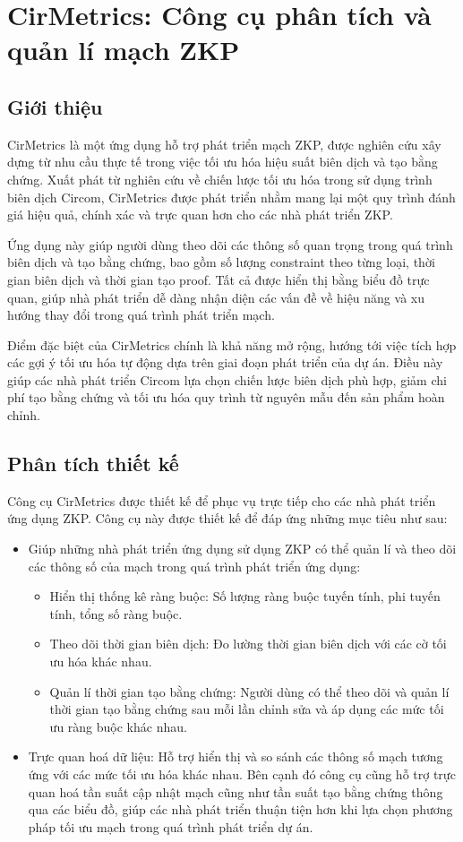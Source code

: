 \chapter{CirMetrics: Công cụ phân tích và quản lí mạch ZKP}
\label{chap:chap6}
\section{Giới thiệu}
CirMetrics là một ứng dụng hỗ trợ phát triển mạch ZKP, được nghiên cứu xây dựng từ nhu cầu thực tế trong việc tối ưu hóa hiệu suất biên dịch và tạo bằng chứng. Xuất phát từ nghiên cứu về chiến lược tối ưu hóa trong sử dụng trình biên dịch Circom, CirMetrics được phát triển nhằm mang lại một quy trình đánh giá hiệu quả, chính xác và trực quan hơn cho các nhà phát triển ZKP.

Ứng dụng này giúp người dùng theo dõi các thông số quan trọng trong quá trình biên dịch và tạo bằng chứng, bao gồm số lượng constraint theo từng loại, thời gian biên dịch và thời gian tạo proof. Tất cả được hiển thị bằng biểu đồ trực quan, giúp nhà phát triển dễ dàng nhận diện các vấn đề về hiệu năng và xu hướng thay đổi trong quá trình phát triển mạch.

Điểm đặc biệt của CirMetrics chính là khả năng mở rộng, hướng tới việc tích hợp các gợi ý tối ưu hóa tự động dựa trên giai đoạn phát triển của dự án. Điều này giúp các nhà phát triển Circom lựa chọn chiến lược biên dịch phù hợp, giảm chi phí tạo bằng chứng và tối ưu hóa quy trình từ nguyên mẫu đến sản phẩm hoàn chỉnh.
\section{Phân tích thiết kế}
Công cụ CirMetrics được thiết kế để phục vụ trực tiếp cho các nhà phát triển ứng dụng ZKP. Công cụ này được thiết kế để đáp ứng những mục tiêu như sau:

\begin{itemize}
    \item Giúp những nhà phát triển ứng dụng sử dụng ZKP có thể quản lí và theo dõi các thông số của mạch trong quá trình phát triển ứng dụng:
    \begin{itemize}
        \item Hiển thị thống kê ràng buộc: Số lượng ràng buộc tuyến tính, phi tuyến tính, tổng số ràng buộc.
        \item Theo dõi thời gian biên dịch: Đo lường thời gian biên dịch với các cờ tối ưu hóa khác nhau.
        \item Quản lí thời gian tạo bằng chứng: Người dùng có thể theo dõi và quản lí thời gian tạo bằng chứng sau mỗi lần chỉnh sửa và áp dụng các mức tối ưu ràng buộc khác nhau.
    \end{itemize}
    \item Trực quan hoá dữ liệu: Hỗ trợ hiển thị và so sánh các thông số mạch tương ứng với các mức tối ưu hóa khác nhau. Bên cạnh đó công cụ cũng hỗ trợ trực quan hoá tần suất cập nhật mạch cũng như tần suất tạo bằng chứng thông qua các biểu đồ, giúp các nhà phát triển thuận tiện hơn khi lựa chọn phương pháp tối ưu mạch trong quá trình phát triển dự án.
\end{itemize}

